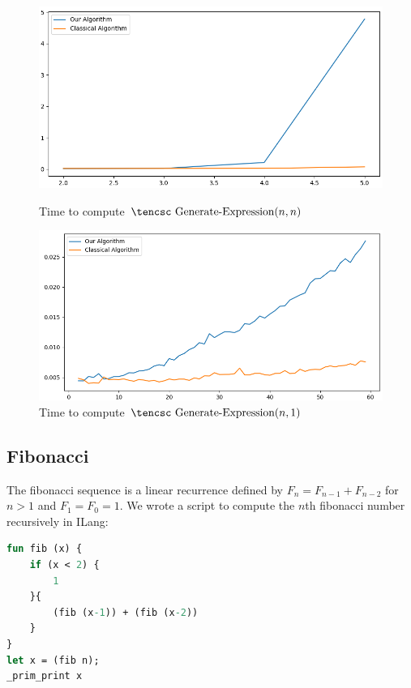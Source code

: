 \documentclass{llncs}
\begin{document}
\begin{figure}

    \centerline{\includegraphics[width=\hsize]{../Docs/Images/expr.png}}
    \caption{Time to compute $\hbox{\tencsc Generate-Expression}(n,n)$}
    \label{fig:expr1}
    \medskip
    \centerline{\includegraphics[width=\hsize]{../Docs/Images/expr1.png}}
    \caption{Time to compute $\hbox{\tencsc Generate-Expression}(n,1)$}
    \label{fig:expr2}

\end{figure}

\subsection{Fibonacci}

The fibonacci sequence is a linear recurrence defined by $F_n=F_{n-1}+F_{n-2}$ for $n>1$ and $F_1=F_0=1$.
We wrote a script to compute the $n$th fibonacci number recursively in ILang:

\begin{lstlisting}[language=Caml, frame=single]
fun fib (x) {
    if (x < 2) {
        1
    }{
        (fib (x-1)) + (fib (x-2))
    }
}
let x = (fib n);
_prim_print x
\end{lstlisting}
\end{document}
